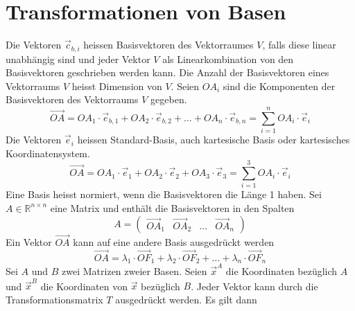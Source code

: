 \section{Transformationen von Basen}
Die Vektoren $\overrightarrow{c}_{b,i}$ heissen Basisvektoren des Vektorraumes $V$, falls diese linear unabhängig sind und jeder Vektor $V$ als Linearkombination von den Basisvektoren geschrieben werden kann.
\newline\newline
Die Anzahl der Basisvektoren eines Vektorraums $V$ heisst Dimension von $V$.
\newline\newline
Seien $OA_i$ sind die Komponenten der Basisvektoren des Vektorraums $V$ gegeben. 
\begin{equation}
\boxed{\overrightarrow{OA}=OA_1\cdot \overrightarrow{e}_{b,1}+OA_2\cdot \overrightarrow{e}_{b,2}+\dotso+OA_n\cdot \overrightarrow{e}_{b,n}=\displaystyle \sum_{i=1}^nOA_i\cdot \overrightarrow{e}_i}
\end{equation}
Die Vektoren $\overrightarrow{e}_i$ heissen Standard-Basis, auch kartesische Basis oder kartesisches Koordinatensystem.
\begin{equation}  
\boxed{\overrightarrow{OA}=OA_1\cdot \overrightarrow{e}_1+OA_2\cdot \overrightarrow{e}_2+OA_3\cdot \overrightarrow{e}_3=\displaystyle \sum_{i=1}^3OA_i\cdot \overrightarrow{e}_i}
\end{equation}  
Eine Basis heisst normiert, wenn die Basisvektoren die Länge 1 haben.
\newline\newline
Sei $A\in\mathbb{R}^{n\times n}$ eine Matrix und enthält die Basisvektoren in den Spalten
\begin{equation}
\boxed{A=\begin{pmatrix}\overrightarrow{OA}_1&\overrightarrow{OA}_2&\dotso&\overrightarrow{OA}_n\end{pmatrix}}
\end{equation}
Ein Vektor $\overrightarrow{OA}$ kann auf eine andere Basis ausgedrückt werden
\begin{equation}
\boxed{\overrightarrow{OA}=\lambda_1\cdot \overrightarrow{OF}_1+\lambda_2\cdot \overrightarrow{OF}_2+\dotso+\lambda_n\cdot \overrightarrow{OF}_n}
\end{equation}
Sei $A$ und $B$ zwei Matrizen zweier Basen. Seien $\overrightarrow{x}^A$ die Koordinaten bezüglich $A$ und $\overrightarrow{x}^B$ die Koordinaten von $\overrightarrow{x}$ bezüglich $B$. Jeder Vektor kann durch die Transformationsmatrix $T$ ausgedrückt werden. Es gilt dann
